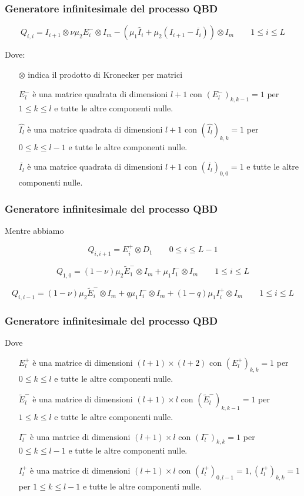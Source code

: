 \documentclass{beamer}
\begin{document}
\begin{frame}
    \frametitle{Generatore infinitesimale del processo QBD}
    \begin{block}{}
        $$ Q_{i,i} = I_{i+1} \otimes \nu \mu_2 E_i^{-} \otimes I_m - (\mu_1 \widehat{I}_i + \mu_2 (I_{i+1} - \overline{I_i})) \otimes I_m \qquad 1 \leq i \leq L$$
    \end{block}
    Dove:
    \begin{itemize}
        \item [$\otimes$] indica il prodotto di Kronecker per matrici
        \item [$E_l^-$] è una matrice quadrata di dimensioni $l+1$ con $(E_l^-)_{k,k-1} = 1$ per $1 \leq k \leq l$ e tutte le altre componenti nulle.
        \item [$\widehat{I_l}$] è una matrice quadrata di dimensioni $l+1$ con $(\widehat{I_l})_{k,k} = 1$ per $0 \leq k \leq l-1$ e tutte le altre componenti nulle.
        \item [$\overline{I_l}$] è una matrice quadrata di dimensioni $l+1$ con $(\overline{I_l})_{0,0} = 1$ e tutte le altre componenti nulle.
    \end{itemize}
\end{frame}


\begin{frame}
    \frametitle{Generatore infinitesimale del processo QBD}
    Mentre abbiamo
    \begin{block}{}
        $$ Q_{i,i+1} = E_i^+ \otimes D_1 \qquad 0 \leq i \leq L-1 $$
    \end{block}
    \begin{block}{}
        $$ Q_{1,0} = (1-\nu) \mu_2 \widetilde{E}_1^- \otimes I_m + \mu_1 I_1^- \otimes I_m \qquad 1 \leq i \leq L $$
    \end{block}
    \begin{block}{}
        $$ Q_{i,i-1} = (1-\nu) \mu_2 \widetilde{E}_i^- \otimes I_m + q \mu_1 I_i^- \otimes I_m + (1-q) \mu_1 I_i^+ \otimes I_m \qquad 1 \leq i \leq L $$
    \end{block}
\end{frame}


\begin{frame}
    \frametitle{Generatore infinitesimale del processo QBD}
    Dove
    \begin{itemize}
        \item [$E_l^+$] è una matrice di dimensioni $(l+1) \times (l+2)$ con $(E_l^+)_{k,k} = 1$ per $0 \leq k \leq l$ e tutte le altre componenti nulle.
        \item [$\widetilde{E}_l^-$] è una matrice di dimensioni $(l+1) \times l$ con $(\widetilde{E}_l^-)_{k,k-1} = 1$ per $1 \leq k \leq l$ e tutte le altre componenti nulle.
        \item [$I_l^-$] è una matrice di dimensioni $(l+1) \times l$ con $(I_l^-)_{k,k} = 1$ per $0 \leq k \leq l-1$ e tutte le altre componenti nulle.
        \item [$I_l^+$] è una matrice di dimensioni $(l+1) \times l$ con  $(I_l^+)_{0,l-1} = 1, (I_l^+)_{k,k} = 1$ per $1 \leq k \leq l-1$ e tutte le altre componenti nulle.
    \end{itemize}
\end{frame}
\end{document}
